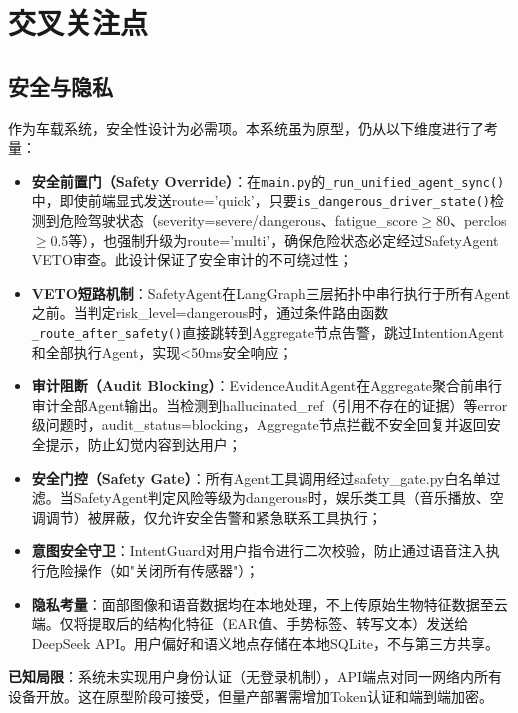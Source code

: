 \documentclass[a4paper]{article}
\begin{document}
\section{交叉关注点}

\subsection{安全与隐私}

作为车载系统，安全性设计为必需项。本系统虽为原型，仍从以下维度进行了考量：

\begin{itemize}
    \item \textbf{安全前置门（Safety Override）}：在\texttt{main.py}的\texttt{\_run\_unified\_agent\_sync()}中，即使前端显式发送route='quick'，只要\texttt{is\_dangerous\_driver\_state()}检测到危险驾驶状态（severity=severe/dangerous、fatigue\_score$\geq$80、perclos$\geq$0.5等），也强制升级为route='multi'，确保危险状态必定经过SafetyAgent VETO审查。此设计保证了安全审计的不可绕过性；
    \item \textbf{VETO短路机制}：SafetyAgent在LangGraph三层拓扑中串行执行于所有Agent之前。当判定risk\_level=dangerous时，通过条件路由函数\texttt{\_route\_after\_safety()}直接跳转到Aggregate节点告警，跳过IntentionAgent和全部执行Agent，实现<50ms安全响应；
    \item \textbf{审计阻断（Audit Blocking）}：EvidenceAuditAgent在Aggregate聚合前串行审计全部Agent输出。当检测到hallucinated\_ref（引用不存在的证据）等error级问题时，audit\_status=blocking，Aggregate节点拦截不安全回复并返回安全提示，防止幻觉内容到达用户；
    \item \textbf{安全门控（Safety Gate）}：所有Agent工具调用经过safety\_gate.py白名单过滤。当SafetyAgent判定风险等级为dangerous时，娱乐类工具（音乐播放、空调调节）被屏蔽，仅允许安全告警和紧急联系工具执行；
    \item \textbf{意图安全守卫}：IntentGuard对用户指令进行二次校验，防止通过语音注入执行危险操作（如"关闭所有传感器"）；
    \item \textbf{隐私考量}：面部图像和语音数据均在本地处理，不上传原始生物特征数据至云端。仅将提取后的结构化特征（EAR值、手势标签、转写文本）发送给DeepSeek API。用户偏好和语义地点存储在本地SQLite，不与第三方共享。
\end{itemize}

\textbf{已知局限}：系统未实现用户身份认证（无登录机制），API端点对同一网络内所有设备开放。这在原型阶段可接受，但量产部署需增加Token认证和端到端加密。
\end{document}
